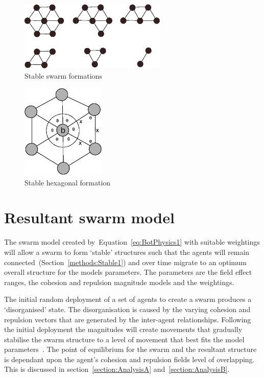\begin{figure}[H]
\begin{center}
\includegraphics[width=7cm]{CHAPTER-2/figures/StableForms}
\end{center}
\caption{Stable swarm formations}\label{fig:StableForms}
\end{figure}

\begin{figure}[H]
\begin{center}
\includegraphics[width=4cm]{CHAPTER-2/figures/Hexagon}
\end{center}
\caption{Stable hexagonal formation}\label{fig:StableFormHexagon}
\end{figure}



\section{Resultant swarm model}
The swarm model created by~Equation~\ref{eq:BotPhysics1} with suitable weightings will allow a swarm to form `stable' structures such that the agents will remain connected~(Section~\ref{methods:Stable1}) and over time migrate to an optimum overall structure for the models parameters. The parameters are the field effect ranges, the cohesion and repulsion magnitude models and the weightings. 

The initial random deployment of a set of agents to create a swarm produces a `disorganised' state. The disorganisation is caused by the varying cohesion and repulsion vectors that are generated by the inter-agent relationships. Following the initial deployment the magnitudes will create movements that gradually stabilise the swarm structure to a level of movement that best fits the model parameters~\cite{PG:08, WF:12}. The point of equilibrium for the swarm and the resultant structure is dependant upon the agent's cohesion and repulsion fields level of overlapping. This is discussed in section~\ref{section:AnalysisA} and~\ref{section:AnalysisB}.

